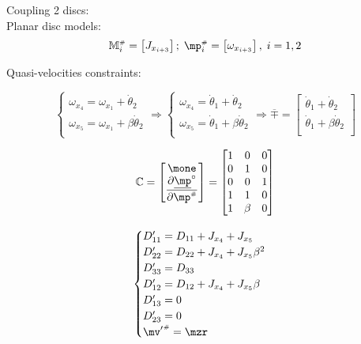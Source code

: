 \documentclass[a4paper,11pt,brazil,fleqn]{article}
\begin{document}
Coupling 2 discs: \\

Planar disc models: 
\begin{equation}
\mM\ssh_i = \begin{bmatrix} J_{x_{i+3}} \end{bmatrix}; \; \mp\ssh_i = \begin{bmatrix} \omega_{x_{i+3}} \end{bmatrix}, \; i = 1, 2
\end{equation}

Quasi-velocities constraints:

\begin{equation}
\begin{cases}
\omega_{x_4} = \omega_{x_1} + \dot{\theta}_2 \\
\omega_{x_5} = \omega_{x_1} + \beta\dot{\theta}_2 \\
\end{cases}
\Rightarrow
\begin{cases}
\omega_{x_4} = \dot{\theta}_1 + \dot{\theta}_2 \\
\omega_{x_5} = \dot{\theta}_1 + \beta\dot{\theta}_2 \\
\end{cases}
\Rightarrow
\overline{\mp} = 
\begin{bmatrix}
\dot{\theta}_1 + \dot{\theta}_2 \\
\dot{\theta}_1 + \beta\dot{\theta}_2 \\
\end{bmatrix}
\end{equation}

\begin{equation}
\mC =
\begin{bmatrix}
\mone \\
\displaystyle\frac{\partial \underline{\mp}^\circ}{\partial \mp\ssh}
\end{bmatrix}  =
\begin{bmatrix}
1 & 0 & 0 \\
0 & 1 & 0 \\
0 & 0 & 1 \\
1 & 1     & 0 \\
1 & \beta & 0 \\
\end{bmatrix} 
\end{equation}

\begin{equation}
\begin{cases}
D'_{11} = D_{11} + J_{x_4} + J_{x_5} \\
D'_{22} = D_{22} + J_{x_4} + J_{x_5} \beta^2 \\
D'_{33} = D_{33} \\
D'_{12} = D_{12} + J_{x_4} + J_{x_5} \beta \\
D'_{13} = 0 \\
D'_{23} = 0\\
{\mv'}\ssh = \mzr \\
\end{cases}
\end{equation}
\end{document}
